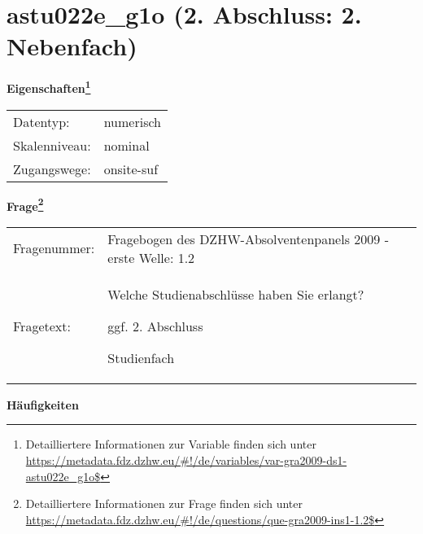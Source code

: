 
    \setcounter{footnote}{0}

    \vspace*{-1.8cm}
	\section{astu022e\_g1o (2. Abschluss: 2. Nebenfach)}
	\label{section:astu022e_g1o}



    \vspace*{0.5cm}
    \noindent\textbf{Eigenschaften\footnote{Detailliertere Informationen zur Variable finden sich unter
		\url{https://metadata.fdz.dzhw.eu/\#!/de/variables/var-gra2009-ds1-astu022e_g1o$}}}\\
	\begin{tabularx}{\hsize}{@{}lX}
	Datentyp: & numerisch \\
	Skalenniveau: & nominal \\
	Zugangswege: &
	  onsite-suf
 \\
    \end{tabularx}



				\vspace*{0.5cm}
                \noindent\textbf{Frage\footnote{Detailliertere Informationen zur Frage finden sich unter
		              \url{https://metadata.fdz.dzhw.eu/\#!/de/questions/que-gra2009-ins1-1.2$}}}\\
				\begin{tabularx}{\hsize}{@{}lX}
					Fragenummer: &
					  Fragebogen des DZHW-Absolventenpanels 2009 - erste Welle:
					  1.2
 \\
					Fragetext: & Welche Studienabschlüsse haben Sie erlangt?\par  ggf. 2. Abschluss\par  Studienfach \\
				\end{tabularx}





        		\vspace*{0.5cm}
                \noindent\textbf{Häufigkeiten}

